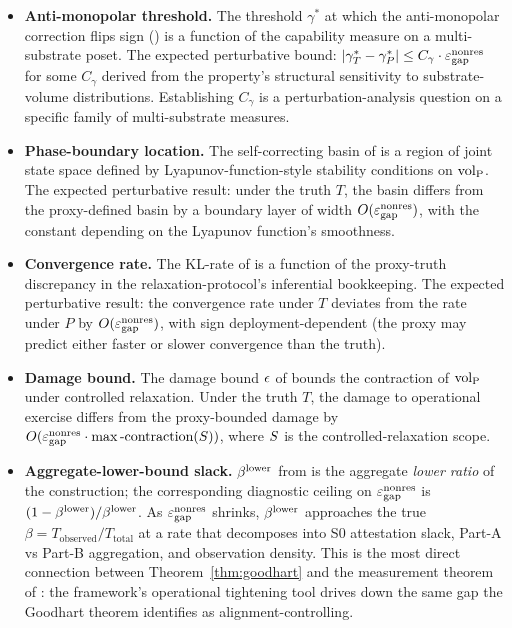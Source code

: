 \begin{itemize}
\item \textbf{Anti-monopolar threshold.}  The threshold
  $\gamma^*$ at which the anti-monopolar correction flips sign
  (\citep[Proposition~6]{lasser2026horizon}) is a function of the
  capability measure on a multi-substrate poset.  The expected
  perturbative bound:
  $|\gamma^*_{T} - \gamma^*_{P}| \leq C_{\gamma} \cdot \varepsilon_{\mathrm{gap}}^{\mathrm{nonres}}$
  for some $C_{\gamma}$ derived from the property's structural
  sensitivity to substrate-volume distributions.  Establishing
  $C_{\gamma}$ is a perturbation-analysis question on a specific
  family of multi-substrate measures.

\item \textbf{Phase-boundary location.}  The self-correcting basin
  of \citep[Theorem~1]{lasser2026phase} is a region of joint state
  space defined by Lyapunov-function-style stability conditions on
  ${\operatorname{vol}_{\mathrm{P}}}$.  The expected perturbative result: under the truth $T$,
  the basin differs from the proxy-defined basin by a boundary
  layer of width $O(\varepsilon_{\mathrm{gap}}^{\mathrm{nonres}})$, with the constant depending on
  the Lyapunov function's smoothness.

\item \textbf{Convergence rate.}  The KL-rate of
  \citep[Theorem~2]{lasser2026wamura} is a function of the
  proxy-truth discrepancy in the relaxation-protocol's
  inferential bookkeeping.  The expected perturbative result: the
  convergence rate under $T$ deviates from the rate under $P$ by
  $O(\varepsilon_{\mathrm{gap}}^{\mathrm{nonres}})$, with sign deployment-dependent (the proxy may
  predict either faster or slower convergence than the truth).

\item \textbf{Damage bound.}  The damage bound $\epsilon$ of
  \citep[Theorem~1]{lasser2026wamura} bounds the contraction of
  ${\operatorname{vol}_{\mathrm{P}}}$ under controlled relaxation.  Under the truth $T$, the
  damage to operational exercise differs from the proxy-bounded
  damage by $O(\varepsilon_{\mathrm{gap}}^{\mathrm{nonres}} \cdot \max\text{-contraction}(S))$,
  where $S$ is the controlled-relaxation scope.

\item \textbf{Aggregate-lower-bound slack.}  $\beta^{\mathrm{lower}}$ from
  \citep[Theorem~2]{lasser2026paper8a} is the aggregate
  \emph{lower ratio} of the construction; the corresponding
  diagnostic ceiling on $\varepsilon_{\mathrm{gap}}^{\mathrm{nonres}}$ is $(1 - \beta^{\mathrm{lower}})/\beta^{\mathrm{lower}}$.
  As $\varepsilon_{\mathrm{gap}}^{\mathrm{nonres}}$ shrinks, $\beta^{\mathrm{lower}}$ approaches the true
  $\beta = T_{\mathrm{observed}} / T_{\mathrm{total}}$ at a rate
  that decomposes into S0 attestation slack, Part-A vs Part-B
  aggregation, and observation density.
  This is the most direct connection between Theorem~\ref{thm:goodhart}
  and the measurement theorem of
  \citep[Revealed~Sacrifice]{lasser2026paper8a}: the framework's
  operational tightening tool drives down the same gap the Goodhart
  theorem identifies as alignment-controlling.
\end{itemize}

